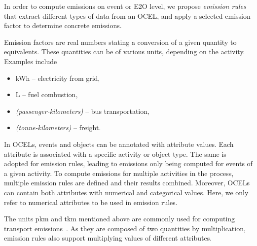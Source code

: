In order to compute emissions on event or E2O level,
we propose \textit{emission rules} that extract different types of data from an OCEL, and apply a selected emission factor
to determine concrete emissions.

Emission factors are real numbers stating a conversion of a given quantity to \COtwo{} equivalents.
These quantities can be of various units, depending on the activity.
Examples include
\begin{itemize}[itemsep=-1.5ex]
  \item \unit{\kWh} -- electricity from grid,
  \item \unit{\liter} -- fuel combustion,
  \item \unit{\pkm} \textit{(passenger-kilometers)} -- bus transportation,
  \item \unit{\tkm} \textit{(tonne-kilometers)} -- freight.
\end{itemize}

In OCELs, events and objects can be annotated with attribute values.
Each attribute is associated with a specific activity or object type.
The same is adopted for emission rules,
leading to emissions only being computed for events of a given activity.
To compute emissions for multiple activities in the process, multiple emission rules are defined and their results combined.
Moreover, OCELs can contain both attributes with numerical and categorical values.
Here, we only refer to numerical attributes to be used in emission rules.

The units pkm and tkm mentioned above are commonly used for computing transport emissions~\cite{Shirizadeh24climate}.
As they are composed of two quantities by multiplication, emission rules also support multiplying values of different attributes.


